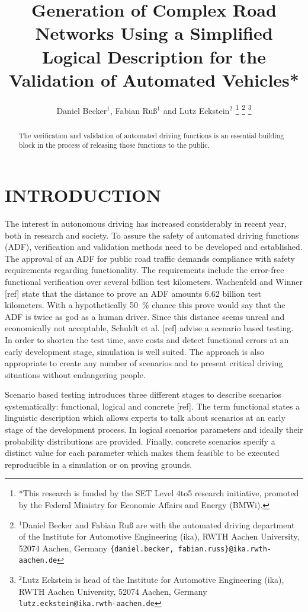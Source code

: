 \documentclass[a4paper, 10pt, conference]{ieeeconf}      %
\title{\LARGE \bf
Generation of Complex Road Networks Using a Simplified Logical Description for the Validation of Automated Vehicles*
}
\author{Daniel Becker$^{1}$, Fabian Ru{\ss}$^{1}$ and Lutz Eckstein$^{2}$%
\thanks{*This research is funded by the SET Level 4to5 research initiative, promoted by the	Federal Ministry for Economic Affairs and Energy (BMWi).}%
\thanks{$^{1}$Daniel Becker and Fabian Ru{\ss} are with the automated driving department of the Institute for Automotive Engineering (ika), RWTH Aachen University, 52074 	Aachen, Germany {\tt\small \{daniel.becker, fabian.russ\}@ika.rwth-aachen.de}}%
\thanks{$^{2}$Lutz Eckstein is head of the Institute for Automotive Engineering (ika), RWTH Aachen University, 52074 Aachen, Germany {\tt\small lutz.eckstein@ika.rwth-aachen.de}}%
}
\begin{document}
\maketitle
\thispagestyle{empty}
\pagestyle{empty}

\begin{abstract} %
The verification and validation of automated driving functions is an essential building block in the process of releasing those functions to the public.  
\end{abstract}

\section{INTRODUCTION}
The interest in autonomous driving has increased considerably in recent year, both in research and society. To assure the safety of automated driving functions (ADF), verification and validation methods need to be developed and established. The approval of an ADF for public road traffic demands compliance with safety requirements regarding functionality. The requirements include the error-free functional verification over several billion test kilometers. Wachenfeld and Winner [ref] state that the distance to prove an ADF amounts 6.62 billion test kilometers. With a hypothetically 50~\% chance this prove would say that the ADF is twice as god as a human driver. Since this distance seems unreal and economically not acceptable, Schuldt et al. [ref] advise a scenario based testing. In order to shorten the test time, save costs and detect functional errors at an early development stage, simulation is well suited. The approach is also appropriate to create any number of scenarios and to present critical driving situations without endangering people.

Scenario based testing introduces three different stages to describe scenarios systematically: functional, logical and concrete [ref]. The term functional states a linguistic description which allows experts to talk about scenarios at an early stage of the development process. In logical scenarios parameters and ideally their probability distributions are provided. Finally, concrete scenarios specify a distinct value for each parameter which makes them feasible to be executed reproducible in a simulation or on proving grounds. 
\end{document}

